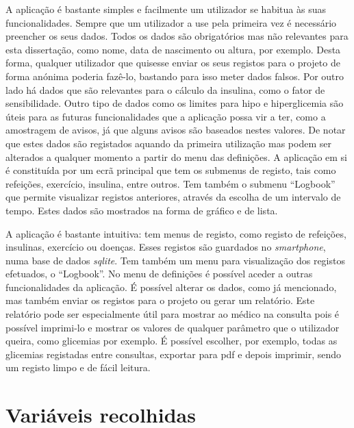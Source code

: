 A aplicação é bastante simples e facilmente um utilizador se habitua às suas funcionalidades. Sempre que um utilizador a use pela primeira vez é necessário preencher os seus dados. Todos os dados são obrigatórios mas não relevantes para esta dissertação, como nome, data de nascimento ou altura, por exemplo. Desta forma, qualquer utilizador que quisesse enviar os seus registos para o projeto de forma anónima poderia fazê-lo, bastando para isso meter dados falsos. 
Por outro lado há dados que são relevantes para o cálculo da insulina, como o fator de sensibilidade. Outro tipo de dados como os limites para hipo e hiperglicemia são úteis para as futuras funcionalidades que a aplicação possa vir a ter, como a amostragem de avisos, já que alguns avisos são baseados nestes valores. De notar que estes dados são registados aquando da primeira utilização mas podem ser alterados a qualquer momento a partir do menu das definições.
A aplicação em si é constituída por um ecrã principal que tem os submenus de registo, tais como refeições, exercício, insulina, entre outros. Tem também o submenu ``Logbook'' que permite visualizar registos anteriores, através da escolha de um intervalo de tempo. Estes dados são mostrados na forma de gráfico e de lista.

A aplicação é bastante intuitiva: tem menus de registo, como registo de refeições, insulinas, exercício ou doenças. Esses registos são guardados no \textit{smartphone}, numa base de dados \textit{sqlite}. Tem também um menu para visualização dos registos efetuados, o ``Logbook''. 
No menu de definições é possível aceder a outras funcionalidades da aplicação. É possível alterar os dados, como já mencionado, mas também enviar os registos para o projeto ou gerar um relatório. Este relatório pode ser especialmente útil para mostrar ao médico na consulta pois é possível imprimi-lo e mostrar os valores de qualquer parâmetro que o utilizador queira, como glicemias por exemplo. É possível escolher, por exemplo, todas as glicemias registadas entre consultas, exportar para pdf e depois imprimir, sendo um registo limpo e de fácil leitura.

\section{Variáveis recolhidas}

